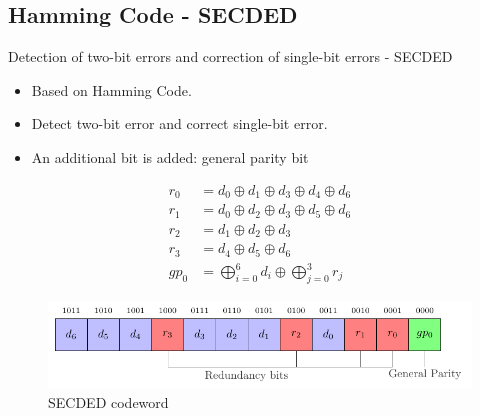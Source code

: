 \subsection{Hamming Code - SECDED}
\begin{frame}{Detection of two-bit errors and correction of single-bit errors - SECDED}
    \begin{block}{}
        \begin{itemize}
            \justifying
            \item Based on Hamming Code.
            \item Detect two-bit error and correct single-bit error.
            \item An additional bit is added: general parity bit
        \end{itemize}
    \end{block}

    \begin{minipage}[c]{0.4\linewidth}
        \begin{equation} \label{equat:secded_encoder}
            \begin{split}
                r_{0}  &= d_{0} \oplus d_{1} \oplus d_{3} \oplus d_{4} \oplus d_{6} \\
                r_{1}  &= d_{0} \oplus d_{2} \oplus d_{3} \oplus d_{5} \oplus d_{6} \\
                r_{2}  &= d_{1} \oplus d_{2} \oplus d_{3} \\
                r_{3}  &= d_{4} \oplus d_{5} \oplus d_{6} \\
                gp_{0} &= \bigoplus_{i=0}^{6} d_{i} \oplus \bigoplus_{j=0}^{3} r_{j}
            \end{split}
        \end{equation}
    \end{minipage}\hfill%
    \begin{minipage}[c]{0.6\linewidth}
        \begin{figure}
            \centering
            \includegraphics[width=\textwidth, page=1]{src/4_strategies/img/secded.pdf}
            \caption{SECDED codeword}
            \label{fig:secded_codeword}
        \end{figure}
    \end{minipage}
\end{frame}


